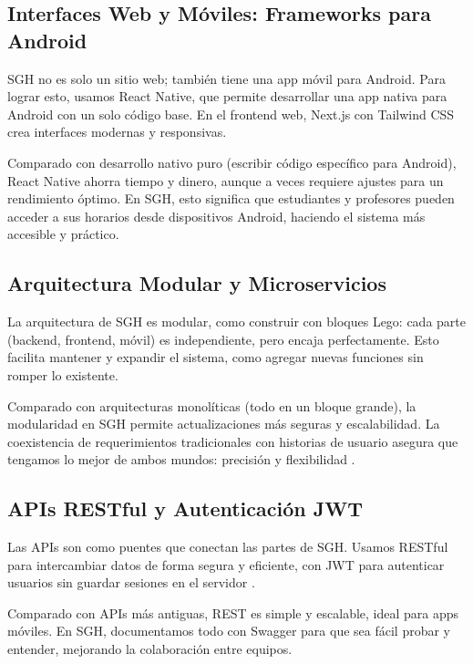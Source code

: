 \subsection{Interfaces Web y Móviles: Frameworks para Android}
SGH no es solo un sitio web; también tiene una app móvil para Android. Para lograr esto, usamos React Native, que permite desarrollar una app nativa para Android con un solo código base. En el frontend web, Next.js con Tailwind CSS crea interfaces modernas y responsivas.

Comparado con desarrollo nativo puro (escribir código específico para Android), React Native ahorra tiempo y dinero, aunque a veces requiere ajustes para un rendimiento óptimo. En SGH, esto significa que estudiantes y profesores pueden acceder a sus horarios desde dispositivos Android, haciendo el sistema más accesible y práctico.

\subsection{Arquitectura Modular y Microservicios}
La arquitectura de SGH es modular, como construir con bloques Lego: cada parte (backend, frontend, móvil) es independiente, pero encaja perfectamente. Esto facilita mantener y expandir el sistema, como agregar nuevas funciones sin romper lo existente.

Comparado con arquitecturas monolíticas (todo en un bloque grande), la modularidad en SGH permite actualizaciones más seguras y escalabilidad. La coexistencia de requerimientos tradicionales con historias de usuario asegura que tengamos lo mejor de ambos mundos: precisión y flexibilidad \cite{izaurralde2013}.

\subsection{APIs RESTful y Autenticación JWT}
Las APIs son como puentes que conectan las partes de SGH. Usamos RESTful para intercambiar datos de forma segura y eficiente, con JWT para autenticar usuarios sin guardar sesiones en el servidor \cite{cein2025}.

Comparado con APIs más antiguas, REST es simple y escalable, ideal para apps móviles. En SGH, documentamos todo con Swagger para que sea fácil probar y entender, mejorando la colaboración entre equipos.

